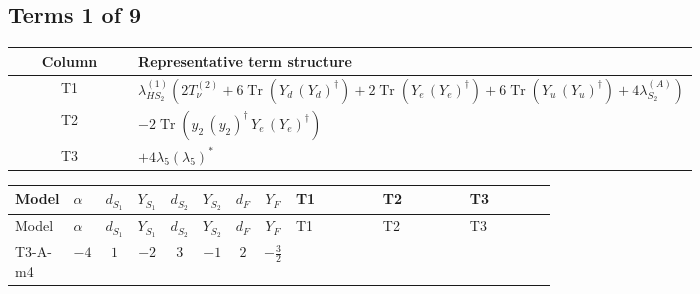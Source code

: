 \documentclass[8pt]{article}
\begin{document}
\begin{landscape}
\subsection*{Terms 1 of 9}
\begin{center}
\begin{tabular}{@{}c >{\raggedright\arraybackslash}p{0.82\linewidth}@{}}
\toprule
Column & Representative term structure \\
\midrule
T1 & \(\displaystyle {\lambda_{HS_2}^{(1)}} (2 T_{\nu}^{(2)}+6 \operatorname{Tr}\!\left({Y_d}\,\left({Y_d}\right)^{\dagger}\right)+2 \operatorname{Tr}\!\left({Y_e}\,\left({Y_e}\right)^{\dagger}\right)+6 \operatorname{Tr}\!\left({Y_u}\,\left({Y_u}\right)^{\dagger}\right)+4 {\lambda_{S_2}^{(A)}})\) \\
\midrule
T2 & \(\displaystyle -2 \operatorname{Tr}\!\left({y_2}\,\left({y_2}\right)^{\dagger}\,{Y_e}\,\left({Y_e}\right)^{\dagger}\right)\) \\
\midrule
T3 & \(\displaystyle +4 {\lambda_5} \left({\lambda_5}\right)^{*}\) \\
\midrule
\bottomrule
\end{tabular}
\end{center}
\smallskip
\tiny
\begin{longtable}{@{}llcccccc >{\raggedright\arraybackslash}p{0.21\linewidth} >{\raggedright\arraybackslash}p{0.21\linewidth} >{\raggedright\arraybackslash}p{0.21\linewidth}@{}}
\toprule
Model & $\alpha$ & $d_{S_1}$ & $Y_{S_1}$ & $d_{S_2}$ & $Y_{S_2}$ & $d_F$ & $Y_F$ & T1 & T2 & T3 \\
\midrule
\endfirsthead
\toprule
Model & $\alpha$ & $d_{S_1}$ & $Y_{S_1}$ & $d_{S_2}$ & $Y_{S_2}$ & $d_F$ & $Y_F$ & T1 & T2 & T3 \\
\midrule
\endhead
T3-A-m4 & $-4$ & $1$ & $-2$ & $3$ & $-1$ & $2$ & $-\frac{3}{2}$ & \scriptsize\adjustbox{max width=\linewidth}{$\begin{gathered} {\lambda_{HS_2}^{(1)}} (2 T_{\nu}^{(2)}+6 \operatorname{Tr}\!\left({Y_d}\,\left({Y_d}\right)^{\dagger}\right)+2 \operatorname{Tr}\!\left({Y_e}\,\left({Y_e}\right)^{\dagger}\right)+6 \operatorname{Tr}\!\left({Y_u}\,\left({Y_u}\right)^{\dagger}\right)+4 {\lambda_{S_2}^{(A)}})\end{gathered}$} & \scriptsize\adjustbox{max width=\linewidth}{$\begin{gathered} -2 \operatorname{Tr}\!\left({y_2}\,\left({y_2}\right)^{\dagger}\,{Y_e}\,\left({Y_e}\right)^{\dagger}\right)\end{gathered}$} & \scriptsize\adjustbox{max width=\linewidth}{$\begin{gathered} +4 {\lambda_5} \left({\lambda_5}\right)^{*}\end{gathered}$} \\

\end{longtable}
\end{landscape}
\end{document}
